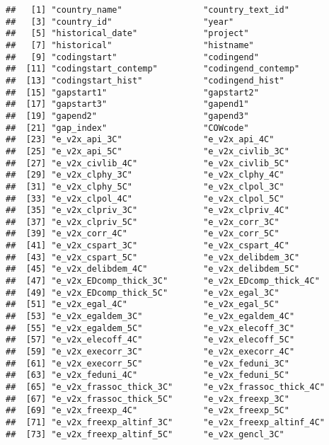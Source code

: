 \documentclass[
]{article}
\begin{document}
\begin{verbatim}
##   [1] "country_name"                "country_text_id"            
##   [3] "country_id"                  "year"                       
##   [5] "historical_date"             "project"                    
##   [7] "historical"                  "histname"                   
##   [9] "codingstart"                 "codingend"                  
##  [11] "codingstart_contemp"         "codingend_contemp"          
##  [13] "codingstart_hist"            "codingend_hist"             
##  [15] "gapstart1"                   "gapstart2"                  
##  [17] "gapstart3"                   "gapend1"                    
##  [19] "gapend2"                     "gapend3"                    
##  [21] "gap_index"                   "COWcode"                    
##  [23] "e_v2x_api_3C"                "e_v2x_api_4C"               
##  [25] "e_v2x_api_5C"                "e_v2x_civlib_3C"            
##  [27] "e_v2x_civlib_4C"             "e_v2x_civlib_5C"            
##  [29] "e_v2x_clphy_3C"              "e_v2x_clphy_4C"             
##  [31] "e_v2x_clphy_5C"              "e_v2x_clpol_3C"             
##  [33] "e_v2x_clpol_4C"              "e_v2x_clpol_5C"             
##  [35] "e_v2x_clpriv_3C"             "e_v2x_clpriv_4C"            
##  [37] "e_v2x_clpriv_5C"             "e_v2x_corr_3C"              
##  [39] "e_v2x_corr_4C"               "e_v2x_corr_5C"              
##  [41] "e_v2x_cspart_3C"             "e_v2x_cspart_4C"            
##  [43] "e_v2x_cspart_5C"             "e_v2x_delibdem_3C"          
##  [45] "e_v2x_delibdem_4C"           "e_v2x_delibdem_5C"          
##  [47] "e_v2x_EDcomp_thick_3C"       "e_v2x_EDcomp_thick_4C"      
##  [49] "e_v2x_EDcomp_thick_5C"       "e_v2x_egal_3C"              
##  [51] "e_v2x_egal_4C"               "e_v2x_egal_5C"              
##  [53] "e_v2x_egaldem_3C"            "e_v2x_egaldem_4C"           
##  [55] "e_v2x_egaldem_5C"            "e_v2x_elecoff_3C"           
##  [57] "e_v2x_elecoff_4C"            "e_v2x_elecoff_5C"           
##  [59] "e_v2x_execorr_3C"            "e_v2x_execorr_4C"           
##  [61] "e_v2x_execorr_5C"            "e_v2x_feduni_3C"            
##  [63] "e_v2x_feduni_4C"             "e_v2x_feduni_5C"            
##  [65] "e_v2x_frassoc_thick_3C"      "e_v2x_frassoc_thick_4C"     
##  [67] "e_v2x_frassoc_thick_5C"      "e_v2x_freexp_3C"            
##  [69] "e_v2x_freexp_4C"             "e_v2x_freexp_5C"            
##  [71] "e_v2x_freexp_altinf_3C"      "e_v2x_freexp_altinf_4C"     
##  [73] "e_v2x_freexp_altinf_5C"      "e_v2x_gencl_3C"             

\end{verbatim}
\end{document}
